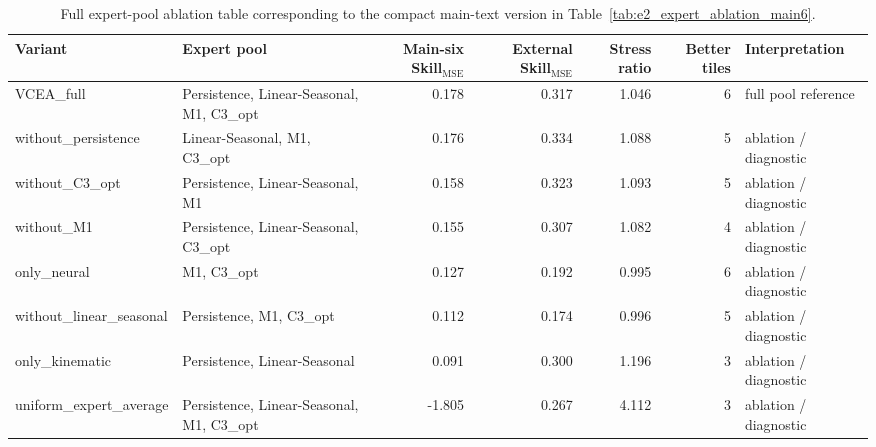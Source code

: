 \documentclass[lettersize,journal]{IEEEtran}
\begin{document}
\begin{table}[!t]
\centering
\footnotesize
\begin{adjustbox}{max width=\textwidth}
\begin{tabular}{llrrrrp{}}
\toprule
Variant & Expert pool & Main-six Skill$_{\mathrm{MSE}}$ & External Skill$_{\mathrm{MSE}}$ & Stress ratio & Better tiles & Interpretation \\
\midrule
VCEA\_full & Persistence, Linear-Seasonal, M1, C3\_opt & 0.178 & 0.317 & 1.046 & 6 & full pool reference \\
without\_persistence & Linear-Seasonal, M1, C3\_opt & 0.176 & 0.334 & 1.088 & 5 & ablation / diagnostic \\
without\_C3\_opt & Persistence, Linear-Seasonal, M1 & 0.158 & 0.323 & 1.093 & 5 & ablation / diagnostic \\
without\_M1 & Persistence, Linear-Seasonal, C3\_opt & 0.155 & 0.307 & 1.082 & 4 & ablation / diagnostic \\
only\_neural & M1, C3\_opt & 0.127 & 0.192 & 0.995 & 6 & ablation / diagnostic \\
without\_linear\_seasonal & Persistence, M1, C3\_opt & 0.112 & 0.174 & 0.996 & 5 & ablation / diagnostic \\
only\_kinematic & Persistence, Linear-Seasonal & 0.091 & 0.300 & 1.196 & 3 & ablation / diagnostic \\
uniform\_expert\_average & Persistence, Linear-Seasonal, M1, C3\_opt & -1.805 & 0.267 & 4.112 & 3 & ablation / diagnostic \\
\bottomrule
\end{tabular}
\end{adjustbox}
\caption{Full expert-pool ablation table corresponding to the compact main-text version in Table~\ref{tab:e2_expert_ablation_main6}.}
\label{tab:e2_expert_ablation_main6_full}
\end{table}
\end{document}
